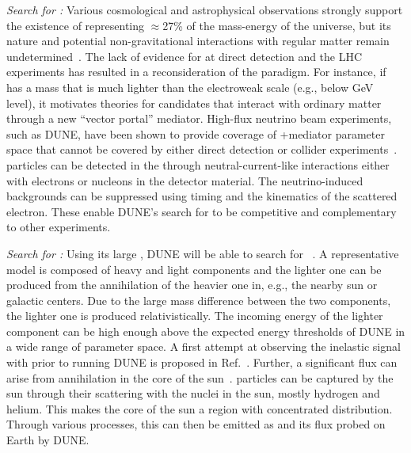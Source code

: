\textit{Search for :} Various cosmological and astrophysical observations strongly support the existence of  representing $\approx$27\% of the mass-energy of the universe, but its nature and potential non-gravitational interactions with regular matter remain undetermined~\cite{Aghanim:2018eyx}. The lack of evidence for  at direct detection and the LHC experiments has resulted in a reconsideration of the  paradigm. For instance, if  has a mass that is much lighter than the electroweak scale (e.g., below GeV level), it motivates theories for  candidates that interact with ordinary matter through a new ``vector portal'' mediator. High-flux neutrino beam experiments, such as DUNE, have been shown to provide coverage of +mediator parameter space that cannot be covered by either direct detection or collider experiments~\cite{Alexander:2016aln, Battaglieri:2017aum, LoSecco:1980nf, Acciarri:2015uup}.  particles can be detected in the  through neutral-current-like interactions either with electrons or nucleons in the detector material. The neutrino-induced backgrounds can be suppressed using timing and the kinematics of the scattered electron. These enable DUNE's search for  to be competitive and complementary to other experiments.

\textit{Search for :} Using its large , DUNE will be able to search for  ~\cite{Agashe:2014yua,Belanger:2011ww}. A representative model is composed of heavy and light  components and the lighter one can be produced from the annihilation of the heavier one in, e.g., the nearby sun or galactic centers. Due to the large mass difference between the two  components, the lighter one is produced relativistically. The incoming energy of the lighter  component can be high enough above the expected energy thresholds of DUNE in a wide range of parameter space. A first attempt at observing the inelastic  signal with  prior to running DUNE is proposed in Ref.~\cite{Chatterjee:2018mej}.
Further, a significant  flux can arise from  annihilation in the core of the sun~\cite{Huang:2013xfa,Berger:2014sqa,Kong:2014mia,Kim:2018veo}.  particles can be captured by the sun through their scattering with the nuclei in the sun, mostly hydrogen and helium. This makes the core of the sun a region with concentrated  distribution. Through various processes, this  can then be emitted as  and its flux probed on Earth by DUNE.

